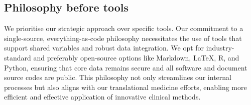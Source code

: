 \subsection*{Philosophy before tools}

We prioritise our strategic approach over specific tools. Our commitment to a single-source, everything-as-code philosophy necessitates the use of tools that support shared variables and robust data integration. We opt for industry-standard and preferably open-source options like Markdown, LaTeX, R, and Python, ensuring that core data remains secure and all software and document source codes are public. This philosophy not only streamlines our internal processes but also aligns with our translational medicine efforts, enabling more efficient and effective application of innovative clinical methods.
